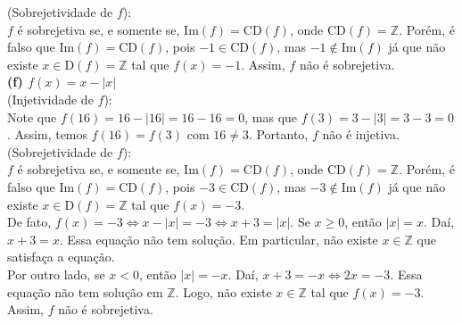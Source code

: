 \documentclass[12pt, a4paper]{article}
\begin{document}
(Sobrejetividade de \(f\)): \\
\(f\) é sobrejetiva se, e somente se, \(\mathrm{Im}(f) = \mathrm{CD}(f)\), onde \(\mathrm{CD}(f) = \mathbb{Z}\). Porém, é falso que \(\mathrm{Im}(f) = \mathrm{CD}(f)\), pois \(-1 \in \mathrm{CD}(f)\), mas \(-1 \notin \mathrm{Im}(f)\) já que não existe \(x \in \mathrm{D}(f)= \mathbb{Z}\) tal que \(f(x) = -1\). Assim, \(f\) não é sobrejetiva. \\

\textbf{(f) \(f(x) = x-|x|\)} \\

(Injetividade de \(f\)): \\
Note que \(f(16) = 16-|16| =16-16=0\), mas que \(f(3)=3-|3| =3-3=0\). Assim, temos \(f(16)=f(3)\) com \(16 \neq 3\). Portanto, \(f\) não é injetiva. \\

(Sobrejetividade de \(f\)): \\
\(f\) é sobrejetiva se, e somente se, \(\mathrm{Im}(f) = \mathrm{CD}(f)\), onde \(\mathrm{CD}(f) = \mathbb{Z}\). Porém, é falso que \(\mathrm{Im}(f) = \mathrm{CD}(f)\), pois \(-3 \in \mathrm{CD}(f)\), mas \(-3 \notin \mathrm{Im}(f)\) já que não existe \(x \in \mathrm{D}(f)= \mathbb{Z}\) tal que \(f(x) = -3\). \\

De fato, \(f(x) = -3 \Longleftrightarrow x - |x| = -3 \Longleftrightarrow x+3 = |x|\). Se \(x \geq 0\), então \(|x| = x\). Daí, \(x+3 = x\). Essa equação não tem solução. Em particular, não existe \(x \in \mathbb{Z}\) que satisfaça a equação. \\

Por outro lado, se \(x < 0\), então \(|x| = -x\). Daí, \(x + 3 = -x \Longleftrightarrow 2x = -3\). Essa equação não tem solução em \(\mathbb{Z}\). Logo, não existe \(x \in \mathbb{Z}\) tal que \(f(x) = -3\). Assim, \(f\) não é sobrejetiva. \\
\end{document}
